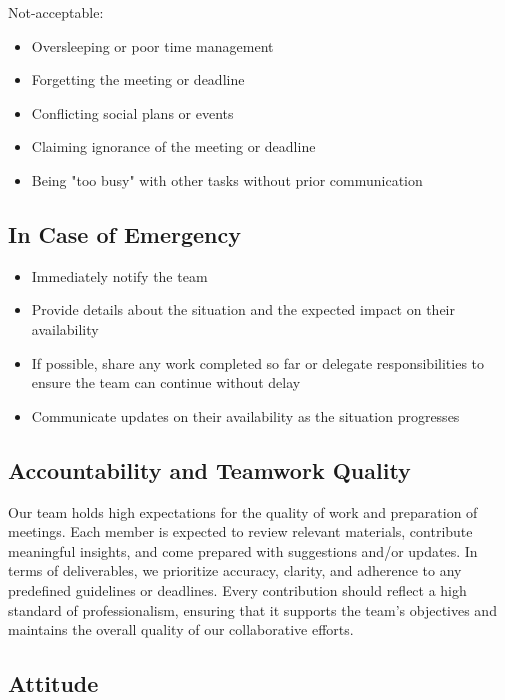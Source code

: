 \documentclass{article}
\begin{document}
Not-acceptable:\\

\begin{itemize}
    \item Oversleeping or poor time management
    \item Forgetting the meeting or deadline
    \item Conflicting social plans or events
    \item Claiming ignorance of the meeting or deadline
    \item Being "too busy" with other tasks without prior communication
\end{itemize}

\subsection{In Case of Emergency}

\begin{itemize}
    \item Immediately notify the team
    \item Provide details about the situation and the expected impact on their availability
    \item If possible, share any work completed so far or delegate responsibilities to ensure the team can continue without delay
    \item Communicate updates on their availability as the situation progresses
\end{itemize}

\subsection{Accountability and Teamwork Quality}

Our team holds high expectations for the quality of work and preparation of meetings. Each member is expected to review relevant materials, contribute meaningful insights, and come prepared with suggestions and/or updates. In terms of deliverables, we prioritize accuracy, clarity, and adherence to any predefined guidelines or deadlines. Every contribution should reflect a high standard of professionalism, ensuring that it supports the team’s objectives and maintains the overall quality of our collaborative efforts.

\subsection{Attitude}
\end{document}
